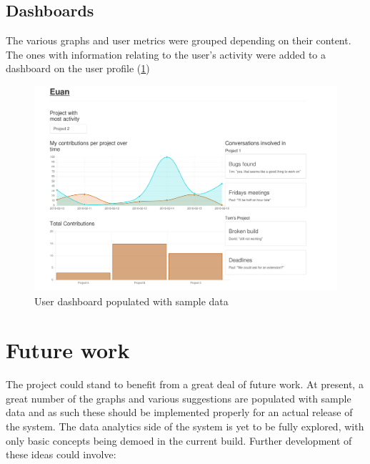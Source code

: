 \documentclass{l4proj}
\begin{document}
\section{Dashboards}

The various graphs and user metrics were grouped depending on their content.  The ones with information relating to the user's activity were added to a dashboard on the user profile (\ref{fig:6})

\begin{figure}[h]
\includegraphics[scale=0.50]{profile-dashboard.png}
\centering
\caption{User dashboard populated with sample data}
\label{fig:6}
\end{figure}


\chapter{Future work}

The project could stand to benefit from a great deal of future work.  At present, a great number of the graphs and various suggestions are populated with sample data and as such these should be implemented properly for an actual release of the system.  The data analytics side of the system is yet to be fully explored, with only basic concepts being demoed in the current build.  Further development of these ideas could involve:
\end{document}

